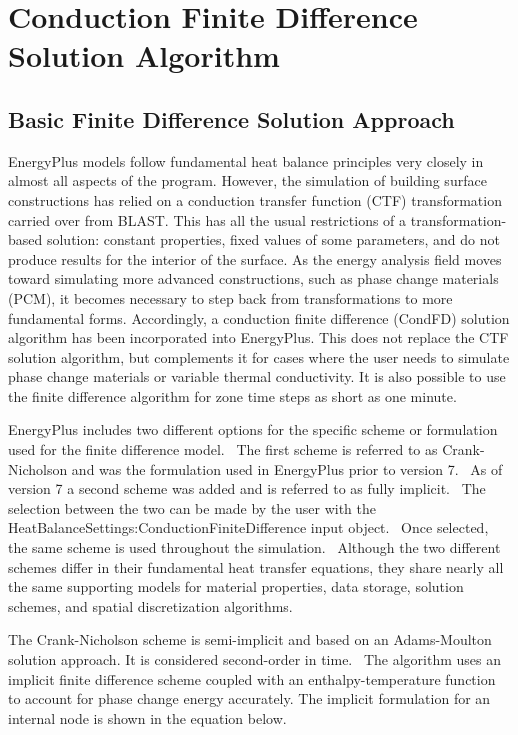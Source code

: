 \section{Conduction Finite Difference Solution Algorithm}\label{conduction-finite-difference-solution-algorithm}

\subsection{Basic Finite Difference Solution Approach}\label{basic-finite-difference-solution-approach}

EnergyPlus models follow fundamental heat balance principles very closely in almost all aspects of the program. However, the simulation of building surface constructions has relied on a conduction transfer function (CTF) transformation carried over from BLAST. This has all the usual restrictions of a transformation-based solution: constant properties, fixed values of some parameters, and do not produce results for the interior of the surface. As the energy analysis field moves toward simulating more advanced constructions, such as phase change materials (PCM), it becomes necessary to step back from transformations to more fundamental forms. Accordingly, a conduction finite difference (CondFD) solution algorithm has been incorporated into EnergyPlus. This does not replace the CTF solution algorithm, but complements it for cases where the user needs to simulate phase change materials or variable thermal conductivity. It is also possible to use the finite difference algorithm for zone time steps as short as one minute.

EnergyPlus includes two different options for the specific scheme or formulation used for the finite difference model.~ The first scheme is referred to as Crank-Nicholson and was the formulation used in EnergyPlus prior to version 7.~ As of version 7 a second scheme was added and is referred to as fully implicit.~ The selection between the two can be made by the user with the HeatBalanceSettings:ConductionFiniteDifference input object.~ Once selected, the same scheme is used throughout the simulation.~ Although the two different schemes differ in their fundamental heat transfer equations, they share nearly all the same supporting models for material properties, data storage, solution schemes, and spatial discretization algorithms.

The Crank-Nicholson scheme is semi-implicit and based on an Adams-Moulton solution approach. It is considered second-order in time.~ The algorithm uses an implicit finite difference scheme coupled with an enthalpy-temperature function to account for phase change energy accurately. The implicit formulation for an internal node is shown in the equation below.

